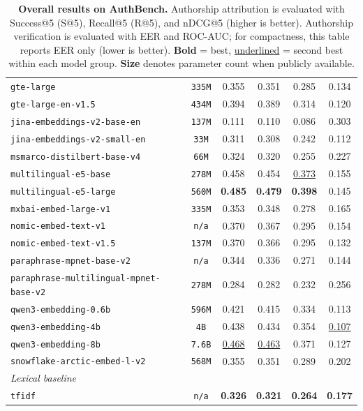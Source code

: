 \documentclass{article}
\newcommand{\rev}[1]{#1}
\begin{document}
\begin{table}[h!]
{\begin{tabular}{lccccc}
\texttt{gte-large} & \texttt{335M} & 0.355 & 0.351 & 0.285 & 0.134 \\
\texttt{gte-large-en-v1.5} & \texttt{434M} & 0.394 & 0.389 & 0.314 & 0.120 \\
\texttt{jina-embeddings-v2-base-en} & \texttt{137M} & 0.111 & 0.110 & 0.086 & 0.303 \\
\texttt{jina-embeddings-v2-small-en} & \texttt{33M} & 0.311 & 0.308 & 0.242 & 0.112 \\
\texttt{msmarco-distilbert-base-v4} & \texttt{66M} & 0.324 & 0.320 & 0.255 & 0.227 \\
\texttt{multilingual-e5-base} & \texttt{278M} & 0.458 & 0.454 & \underline{0.373} & 0.155 \\
\texttt{multilingual-e5-large} & \texttt{560M} & \textbf{0.485} & \textbf{0.479} & \textbf{0.398} & 0.145 \\
\texttt{mxbai-embed-large-v1} & \texttt{335M} & 0.353 & 0.348 & 0.278 & 0.165 \\
\texttt{nomic-embed-text-v1} & \texttt{n/a} & 0.370 & 0.367 & 0.295 & 0.154 \\
\texttt{nomic-embed-text-v1.5} & \texttt{137M} & 0.370 & 0.366 & 0.295 & 0.132 \\
\texttt{paraphrase-mpnet-base-v2} & \texttt{n/a} & 0.344 & 0.336 & 0.271 & 0.144 \\
\texttt{paraphrase-multilingual-mpnet-base-v2} & \texttt{278M} & 0.284 & 0.282 & 0.232 & 0.256 \\
\texttt{qwen3-embedding-0.6b} & \texttt{596M} & 0.421 & 0.415 & 0.334 & 0.113 \\
\texttt{qwen3-embedding-4b} & \texttt{4B} & 0.438 & 0.434 & 0.354 & \underline{0.107} \\
\texttt{qwen3-embedding-8b} & \texttt{7.6B} & \underline{0.468} & \underline{0.463} & 0.371 & 0.127 \\
\texttt{snowflake-arctic-embed-l-v2} & \texttt{568M} & 0.355 & 0.351 & 0.289 & 0.202 \\
\midrule
\multicolumn{6}{l}{\textit{Lexical baseline}} \\
\midrule
\texttt{tfidf} & \texttt{n/a} & \textbf{0.326} & \textbf{0.321} & \textbf{0.264} & \textbf{0.177} \\
\bottomrule
\end{tabular}
}
\caption{\textbf{Overall results on AuthBench.} Authorship attribution is evaluated with Success@5 (S@5), Recall@5 (R@5), and nDCG@5 (higher is better). \rev{Authorship verification is evaluated with EER and ROC-AUC; for compactness, this table reports EER only (lower is better).} \textbf{Bold} = best, \underline{underlined} = second best within each model group. \textbf{Size} denotes parameter count when publicly available.}
\label{tab:overall-leaderboard-full}
\end{table}
\end{document}
